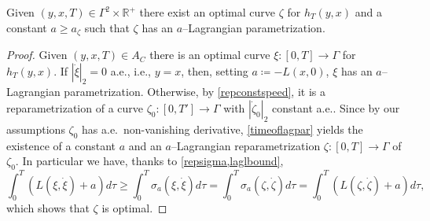 \documentclass[11pt,a4paper,american]{article}
\newcommand{\Rds}{\mathds R}
\begin{document}
    \begin{lem}\label{lagparisopt}
        Given $(y,x,T)\in\Gamma^2\times\Rds^+$ there exist an optimal curve $\zeta$ for $h_T(y,x)$ and a constant $a\ge a_\zeta$ such that $\zeta$ has an $a$--Lagrangian parametrization.
    \end{lem}
    \begin{proof}
        Given $(y,x,T)\in A_C$ there is an optimal curve $\xi:[0,T]\to\Gamma$ for $h_T(y,x)$. If $|\dot\xi|_2=0$ a.e., i.e., $y=x$, then, setting $a\coloneqq-L(x,0)$, $\xi$ has an $a$--Lagrangian parametrization. Otherwise, by \cref{repconstspeed}, it is a reparametrization of a curve $\zeta_0:[0,T']\to\Gamma$ with $|\dot\zeta_0|_2$ constant a.e.. Since by our assumptions $\zeta_0$ has a.e.\ non-vanishing derivative, \cref{timeoflagpar} yields the existence of a constant $a$ and an $a$--Lagrangian reparametrization $\zeta:[0,T]\to\Gamma$ of $\zeta_0$. In particular we have, thanks to \cref{repsigma,laglbound},
        \begin{equation*}
            \int_0^T\left(L\left(\xi,\dot\xi\right)+a\right)d\tau\ge\int_0^T\sigma_a\left(\xi,\dot\xi\right)d\tau=\int_0^T\sigma_a\left(\zeta,\dot\zeta\right)d\tau=\int_0^T\left(L\left(\zeta,\dot\zeta\right)+a\right)d\tau,
        \end{equation*}
        which shows that $\zeta$ is optimal.
    \end{proof}
\end{document}
